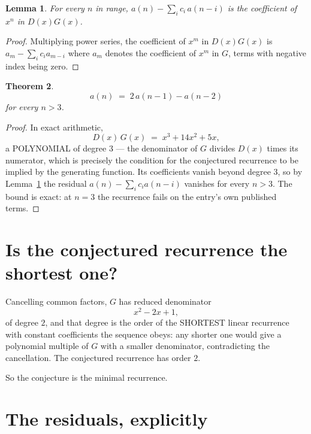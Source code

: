 \documentclass[11pt,a4paper]{article}
\theoremstyle{plain}
\newtheorem{theorem}{Theorem}
\newtheorem{lemma}[theorem]{Lemma}
\theoremstyle{definition}
\begin{document}
\begin{lemma}\label{lem:key}
For every $n$ in range, $a(n)-\sum_i c_i\,a(n-i)$ is the coefficient of $x^{n}$ in
$D(x)G(x)$.
\end{lemma}

\begin{proof}
Multiplying power series, the coefficient of $x^{m}$ in $D(x)G(x)$ is
$a_m-\sum_i c_i a_{m-i}$ where $a_m$ denotes the coefficient of $x^{m}$ in $G$, terms with
negative index being zero.
\end{proof}

\begin{theorem}
\[
a(n)\;=\;2\,a(n-1) - a(n-2)
\]
for every $n>3$.
\end{theorem}

\begin{proof}
In exact arithmetic,
\[
D(x)\,G(x)\;=\;x^{3} + 14 x^{2} + 5 x,
\]
a POLYNOMIAL of degree $3$ --- the denominator of $G$ divides $D(x)$ times its numerator,
which is precisely the condition for the conjectured recurrence to be implied by the
generating function. Its coefficients vanish beyond degree $3$, so by
Lemma~\ref{lem:key} the residual $a(n)-\sum_ic_ia(n-i)$ vanishes for every
$n>3$. The bound is exact: at $n=3$ the recurrence fails on the entry's own published terms.
\end{proof}

\section{Is the conjectured recurrence the shortest one?}

Cancelling common factors, $G$ has reduced denominator
\[
x^{2} - 2 x + 1,
\]
of degree $2$, and that degree is the order of the SHORTEST linear recurrence with
constant coefficients the sequence obeys: any shorter one would give a polynomial multiple of
$G$ with a smaller denominator, contradicting the cancellation. The conjectured recurrence has
order $2$.

So the conjecture is the minimal recurrence.

\section{The residuals, explicitly}
\end{document}
